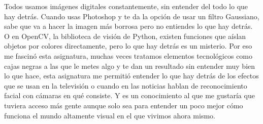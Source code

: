 Todos usamos imágenes digitales constantemente, sin entender del todo lo que hay detrás. Cuando usas Photoshop y te da la opción de usar un filtro Gaussiano, sabe que va a hacer la imagen más borrosa pero no entiendes lo que hay detrás. O en OpenCV, la biblioteca de visión de Python, existen funciones que aíslan objetos por colores directamente, pero lo que hay detrás es un misterio. Por eso me fascinó esta asignatura, muchas veces tratamos elementos tecnológicos como cajas negras a las que le metes algo y te dan un resultado sin entender muy bien lo que hace, esta asignatura me permitió entender lo que hay detrás de los efectos que se usan en la televisión o cuando en las noticias hablan de reconocimiento facial con cámaras en qué consiste. Y es un conocimiento al que me gustaría que tuviera acceso más gente aunque solo sea para entender un poco mejor cómo funciona el mundo altamente visual en el que vivimos ahora mismo.


